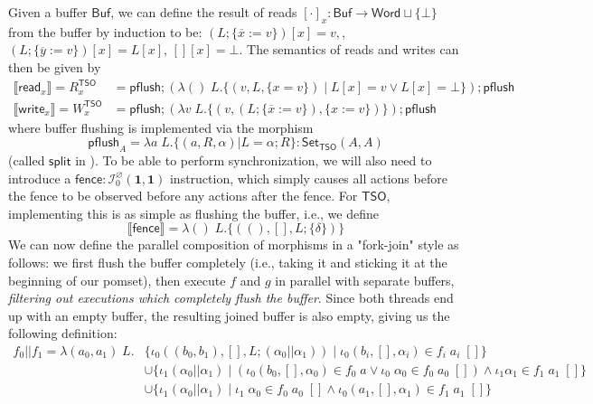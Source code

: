 \documentclass[acmsmall,screen,review]{acmart}
\newcommand{\mc}[1]{\ensuremath{\mathcal{#1}}}
\newcommand{\mb}[1]{\ensuremath{\mathbf{#1}}}
\newcommand{\ms}[1]{\ensuremath{\mathsf{#1}}}
\newcommand{\dnt}[1]{\llbracket{#1}\rrbracket}
\newcommand{\bufloc}[1]{\overline{#1}}
\begin{document}
Given a buffer \(\ms{Buf}\), we can define the result of reads \([\cdot]_x: \ms{Buf} \to \ms{Word}
\sqcup \{\bot\}\) from the buffer by induction to be:
\(
  (L;\{\bufloc{x} := v\})[x] = v,
\),
\(
  (L;\{\bufloc{y} := v\})[x] = L[x]
\),
\(
  [][x] = \bot
\).
The semantics of reads and writes can then be given by
\begin{equation}
  \begin{aligned}
  \dnt{\ms{read}_x} = R_x^{\ms{TSO}} 
    &= \ms{pflush};(\lambda ()\;L. \{(v, L, \{x = v\}) \mid L[x] = v \lor L[x] = \bot\});\ms{pflush} 
  \\
  \dnt{\ms{write}_x} = W_x^{\ms{TSO}}
    &= \ms{pflush};(\lambda v\;L. \{(v, (L;\{\bufloc{x} := v\}), \{x := v\})\});\ms{pflush}
  \end{aligned}
\end{equation}
where buffer flushing is implemented via the morphism 
$$
  \ms{pflush}_A = \lambda a\;L. \{(a, R, \alpha) | L = \alpha;R\}
  : \ms{Set}_{\ms{TSO}}(A, A)
$$
(called \(\ms{split}\) in \cite{sparky}). To be able to perform synchronization, we will also need
to introduce a \(\ms{fence}: \mc{I}^\varnothing_0(\mb{1}, \mb{1})\) instruction, which simply causes
all actions before the fence to be observed before any actions after the fence. For \(\ms{TSO}\),
implementing this is as simple as flushing the buffer, i.e., we define
$$
  \dnt{\ms{fence}} = \lambda ()\;L. \{((), [], L;\{\delta\})\}
$$
We can now define the parallel composition of morphisms in a "fork-join" style as follows: we first
flush the buffer completely (i.e., taking it and sticking it at the beginning of our pomset), then
execute \(f\) and \(g\) in parallel with separate buffers, \textit{filtering out executions which
completely flush the buffer}. Since both threads end up with an empty buffer, the resulting joined
buffer is also empty, giving us the following definition:
\begin{equation}
  \begin{aligned}
    f_0 || f_1 = \lambda (a_0, a_1)\;L. 
    & \{\iota_0 ((b_0, b_1), [], L;(\alpha_0 || \alpha_1)) 
      \mid \iota_0 (b_i, [], \alpha_i) \in f_i\;a_i\;[]\} 
    \\ & \cup \{\iota_1 (\alpha_0 || \alpha_1) 
        \mid (\iota_0 (b_0, [], \alpha_0) \in f_0\;a \lor \iota_0\;\alpha_0 \in f_0\;a_0\;[]) 
        \land \iota_1 \alpha_1 \in f_1\;a_1\;[]\} 
    \\ & \cup \{\iota_1 (\alpha_0 || \alpha_1) 
        \mid \iota_1\;\alpha_0 \in f_0\;a_0\;[] 
        \land \iota_0 (a_1, [], \alpha_1) \in f_1\;a_1\;[]\}
    \end{aligned}
\end{equation}
\end{document}

